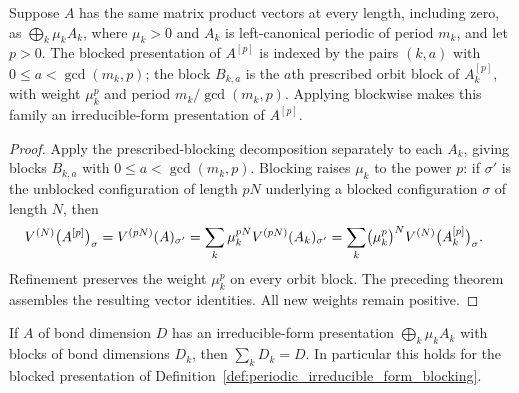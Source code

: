 \begin{definition}
    \label{def:periodic_irreducible_form_blocking}
    \leanok
    Suppose $A$ has the same matrix product vectors at every length,
    including zero, as $\bigoplus_k\mu_k A_k$, where $\mu_k>0$ and
    $A_k$ is left-canonical periodic of period $m_k$, and let $p>0$.
    The blocked presentation of $A^{[p]}$ is indexed by the pairs $(k,a)$ with
    $0\le a<\gcd(m_k,p)$; the block $B_{k,a}$ is the $a$th prescribed orbit
    block of $A_k^{[p]}$, with weight $\mu_k^p$ and period
    $m_k/\gcd(m_k,p)$. Applying
    \cite[Lemma~6, proof of Theorem~4.1]{DeLasCuevas2017Irreducible} blockwise
    makes this family an irreducible-form presentation of $A^{[p]}$.
\end{definition}

\begin{proof}
    \leanok
    Apply the prescribed-blocking decomposition separately to each $A_k$,
    giving blocks $B_{k,a}$ with $0\le a<\gcd(m_k,p)$. Blocking raises
    $\mu_k$ to the power $p$: if $\sigma'$ is the unblocked configuration of
    length $pN$ underlying a blocked configuration $\sigma$ of length $N$, then
    \begin{align}
        V^{(N)}\bigl(A^{[p]}\bigr)_\sigma
         & =V^{(pN)}(A)_{\sigma'}
        =\sum_k\mu_k^{pN}V^{(pN)}(A_k)_{\sigma'}
        =\sum_k\bigl(\mu_k^p\bigr)^NV^{(N)}\bigl(A_k^{[p]}\bigr)_\sigma. \notag
    \end{align}
    Refinement preserves the weight $\mu_k^p$ on every orbit block. The
    preceding theorem assembles the resulting vector identities. All new
    weights remain positive.
\end{proof}

\begin{lemma}
    \label{thm:periodic_irreducible_form_blocking_dim}
    \leanok
    If $A$ of bond dimension $D$ has an irreducible-form presentation
    $\bigoplus_k\mu_kA_k$ with blocks of bond dimensions $D_k$, then
    $\sum_kD_k=D$. In particular this holds for the blocked presentation of
    Definition~\ref{def:periodic_irreducible_form_blocking}.
\end{lemma}

